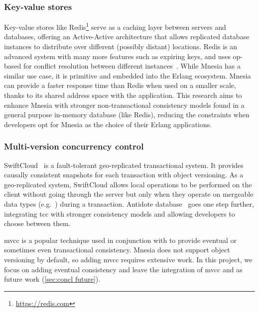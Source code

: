 \subsubsection{Key-value stores}

Key-value stores like Redis\footnote{\url{https://redis.com}} serve as a caching 
layer between servers and databases, offering an Active-Active architecture that allows
replicated database instances to distribute over different (possibly distant) locations.
Redis is an advanced system with many more features such as expiring keys,
and uses op-based  for conflict resolution between different 
instances~\cite{redis2022rediscrdt}. While Mnesia has a similar use case, it is
primitive and embedded into the Erlang ecosystem. 
Mnesia can provide a faster response time than Redis when used on a smaller scale,
thanks to its shared address space with the application. This research aims
to enhance Mnesia with stronger non-transactional consistency models
found in a general purpose in-memory database (like Redis), reducing
the constraints when developers opt for Mnesia as the choice of their Erlang applications.


\subsubsection{Multi-version concurrency control} \label{subsec:related mvcc}

SwiftCloud~\cite{preguica2014SwiftCloud} is a fault-tolerant geo-replicated 
transactional system. It provides causally
consistent snapshots for each transaction with object versioning. As a geo-replicated system, 
SwiftCloud allows local operations to be performed on the client without going
through the server but only when they operate on mergeable data 
types (e.g.\ ) during a transaction. Antidote database~\cite{shapiro2018Antidote} 
goes one step further, integrating \acrshort{tcc} with stronger consistency models and
allowing developers to choose between them.

\acrfull{mvcc} is a popular technique used in conjunction with
 to provide eventual or sometimes even transactional consistency.
Mnesia does not support object versioning by default, so
adding \acrshort{mvcc} requires extensive work. In this project, we focus
on adding eventual consistency and leave the integration of \acrshort{mvcc} and 
 as future work (\cref{sec:concl future}).


